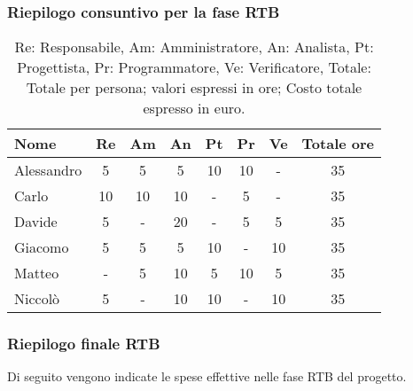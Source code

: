 \subsubsection{Riepilogo consuntivo per la fase RTB}

\begin{table}[H]
	\centering
	\begin{tabular}{l|c|c|c|c|c|c|c}
		\textbf{Nome}         & \textbf{Re} & \textbf{Am} & \textbf{An} & \textbf{Pt} & \textbf{Pr} & \textbf{Ve} & \textbf{Totale ore} \\
		\hline
		Alessandro            & 5           & 5           & 5           & 10           & 10           & -           & 35              \\
		Carlo                 & 10           & 10           & 10           & -           & 5           & -           & 35              \\
		Davide                & 5           & -           & 20          & -           & 5           & 5           & 35              \\
		Giacomo               & 5           & 5           & 5          & 10           & -           & 10           & 35              \\
		Matteo                & -           & 5           & 10          & 5           & 10           & 5           & 35              \\
		Niccolò               & 5           & -           & 10          & 10           & -           & 10           & 35              \\
		\hline
	\end{tabular}
	\caption{Re: Responsabile, Am: Amministratore, An: Analista, Pt: Progettista,
		Pr: Programmatore, Ve: Verificatore, Totale: Totale per persona; valori espressi in ore; Costo totale espresso in euro.}
\end{table}






\subsubsection{Riepilogo finale RTB}

Di seguito vengono indicate le spese effettive nelle fase RTB del progetto.


